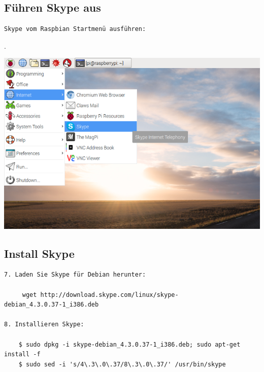 \subsection{Führen Skype aus}
\begin{verbatim}
Skype vom Raspbian Startmenü ausführen:
\end{verbatim}. 
\begin{minipage}{\textwidth}
    \begin{center}
        
        \includegraphics[scale=0.4]{img/skype.png} 
    \end{center}
\end{minipage}

\subsection{Install Skype}
\begin{verbatim}
7. Laden Sie Skype für Debian herunter:

	 wget http://download.skype.com/linux/skype-		debian_4.3.0.37-1_i386.deb

8. Installieren Skype:

	$ sudo dpkg -i skype-debian_4.3.0.37-1_i386.deb; sudo apt-get install -f
	$ sudo sed -i 's/4\.3\.0\.37/8\.3\.0\.37/' /usr/bin/skype
	 
\end{verbatim}
